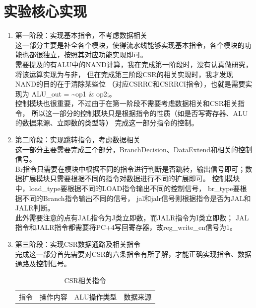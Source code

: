 \documentclass[UTF8]{article}
\begin{document}
    \section{实验核心实现}
    \begin{enumerate}
        \item 第一阶段：实现基本指令，不考虑数据相关 \\
        这一部分主要是补全各个模块，使得流水线能够实现基本指令，各个模块的功能也都很独立，按照其对应功能实现即可。 \\
        需要提及的有ALU中的{\jetbrains NAND}计算，我在完成第一阶段时，没有认真做研究，将该运算实现为与非，
        但在完成第三阶段CSR的相关实现时，我才发现{\jetbrains NAND}的目的在于清除某些位
        （对应{\jetbrains CSRRC}和{\jetbrains CSRRCI}指令），也就是需要实现为
        {\jetbrains ALU\_out = \textasciitilde op1 \& op2;}。\\
        控制模块也很重要，不过由于在第一阶段不需要考虑数据相关和CSR相关指令，
        所以这一部分的控制模块只是根据指令的性质（如是否写寄存器、ALU的数据来源、立即数的类型等）
        完成这一部分指令的控制。
        \item 第二阶段：实现跳转指令，考虑数据相关 \\
        这一部分主要需要完成三个部分，{\jetbrains BranchDecision}、{\jetbrains DataExtend}和相关的控制信号。 \\
        Br指令只需要在模块中根据不同的指令进行判断是否跳转，输出信号即可；数据扩展模块只需要根据不同的指令对数据进行不同的扩展即可。
        控制模块中，{\jetbrains load\_type}要根据不同的LOAD指令输出不同的控制信号，
        {\jetbrains br\_type}要根据不同的Branch指令输出不同的信号，
        {\jetbrains jal}和{\jetbrains jalr}信号则根据指令是否为JAL和JALR判断。\\
        此外需要注意的点有JAL指令为J类立即数，而JALR指令为I类立即数；
        JAL指令和JALR指令都需要将{\jetbrains PC+4}写回寄存器，故{\jetbrains reg\_write\_en}信号为1。
        \item 第三阶段：实现CSR数据通路及相关指令 \\
        完成这一部分首先需要对CSR的六条指令有所了解，才能正确实现指令、数据通路及控制信号。 \\
        \begin{table}[H]
            \centering
            \caption{CSR相关指令}
            \scalebox{0.8}
            {
                \begin{tabular}{|c||c|c||c|}
                    \hline
                    指令 & 操作内容 & ALU操作类型 & 数据来源 \\

\end{tabular}}
\end{table}
\end{enumerate}
\end{document}
